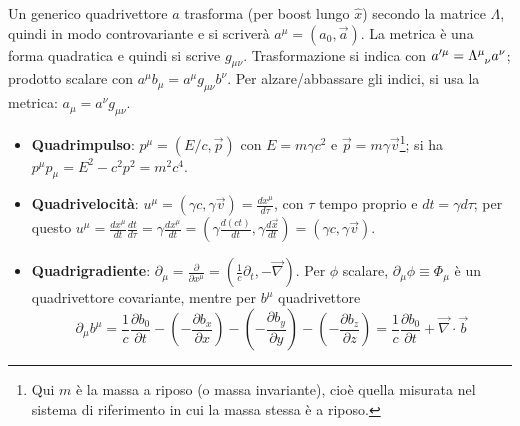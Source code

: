 \documentclass[a4paper]{scrartcl}
\numberwithin{equation}{subsection}
\theoremstyle{style1}
\begin{document}
Un generico quadrivettore $a$ trasforma (per boost lungo $\hat{x}$) secondo la matrice $\Lambda$, quindi in modo controvariante e si scriver\`a $a^\mu =(a_0,\vec{a})$. La metrica \`e una forma quadratica e quindi si scrive $g_{\mu \nu}$. Trasformazione si indica con $a'^\mu = \Lambda\indices{^\mu  _\nu} a^\nu $; prodotto scalare con $a^\mu b_\mu = a^\mu g_{\mu \nu} b^\nu$. Per alzare/abbassare gli indici, si usa la metrica: $a_\mu  = a^\nu g_{\mu \nu} $.
\begin{itemize}
	\item \textbf{Quadrimpulso}: $p^\mu = (E / c, \vec{p})$ con $E = m\gamma c^2$ e $\vec{p}=m \gamma \vec{v}$\footnote{Qui $m$ \`e la massa a riposo (o massa invariante), cio\`e quella misurata nel sistema di riferimento in cui la massa stessa \`e a riposo.}; si ha $p^\mu p_\mu  = E^2 - c^2 p^2 = m^2 c^4$. 

	\item \textbf{Quadrivelocit\`a}: $u^\mu  = (\gamma c, \gamma\vec{v}) = \frac{d x^\mu }{d \tau } $, con $\tau $ tempo proprio e $dt = \gamma d\tau $; per questo $u^\mu  = \frac{d x^\mu }{d t} \frac{d t }{d \tau } = \gamma \frac{d x^\mu }{d t} = \left(\gamma \frac{d (ct)}{d t} , \gamma \frac{d \vec{x}}{d t} \right) = (\gamma c, \gamma\vec{v}) $.
	\item \textbf{Quadrigradiente}: $\partial _\mu =\frac{\partial }{\partial x^\mu } = \left(\frac{1}{c}\partial _t, - \vec{\nabla }\right) $. Per $\phi $ scalare, $\partial _\mu \phi \equiv \Phi_\mu $ \`e un quadrivettore covariante, mentre per $b^\mu $ quadrivettore
\[
\partial _\mu  b^\mu = \frac{1}{c}\frac{\partial b_0}{\partial t } - \left(-\frac{\partial b_x}{\partial x} \right) - \left(-\frac{\partial b_y}{\partial y}\right) - \left(- \frac{\partial b_z}{\partial z}\right) = \frac{1}{c} \frac{\partial b_0}{\partial t} + \vec{\nabla }\cdot \vec{b}
\] 


\end{itemize}
\end{document}
